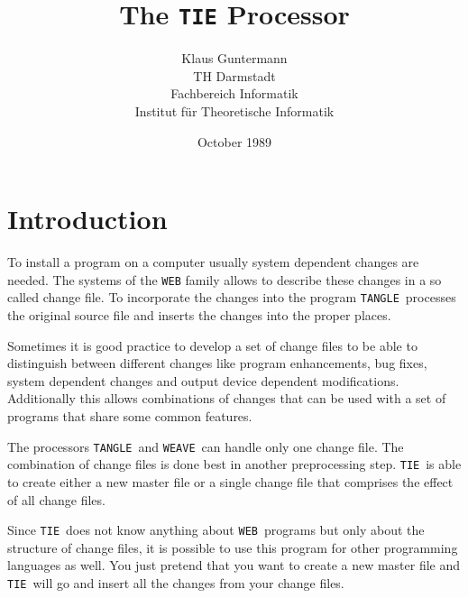 




\let\mc=\small
\def\TANGLE{{\tt TANGLE}}
\def\TIE{{\tt TIE}}
\def\WEAVE{{\tt WEAVE}}
\def\WEB{{\tt WEB}}
\def\CWEB{{\mc CWEB}}
\def\PASCAL{Pascal}




\title{The \TIE{} Processor}
\author{Klaus Guntermann\\
TH Darmstadt\\
Fachbereich Informatik\\
Institut f\"ur Theoretische Informatik}
\date{October 1989}

\maketitle



\section{Introduction}

To install a program on a computer usually
system dependent changes are needed.
The systems of the \WEB{} family allows to describe these changes in a
so called change file.
To incorporate the changes into the program \TANGLE\ processes
the original source file and inserts the changes into the proper places.

Sometimes it is good practice to develop a set of change files to be able to
distinguish between different changes like
program enhancements, bug fixes, system dependent changes 
and output device dependent modifications.
Additionally this allows combinations of changes that can be used with a set of 
programs that share some common features.

The processors \TANGLE\ and \WEAVE\ can handle only one change file.
The combination of change files is done best in another preprocessing step.
\TIE\ is able to create either a new master file or a single change file that 
comprises the effect of all change files.

Since \TIE\ does not know anything about \WEB\ programs but only about the 
structure of change files, it is possible to use this program for other 
programming languages as well.
You just pretend that you want to create a new master file and \TIE\ will go 
and insert all the changes from your change files.



